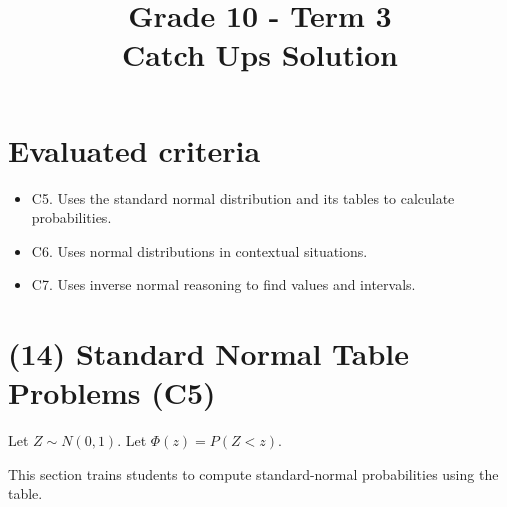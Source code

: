 \makeatletter
{}
\makeatother






\title{Grade 10 - Term 3 \\ Catch Ups Solution}
\author{}
\date{}


	\maketitle
	
	\setcounter{tocdepth}{1}
	\setcounter{secnumdepth}{2}
	\label{toc}
	\tableofcontents
	
	\section*{Evaluated criteria}
	\begin{itemize}
		\item C5. Uses the standard normal distribution and its tables to calculate probabilities.
		\item C6. Uses normal distributions in contextual situations.
		\item C7. Uses inverse normal reasoning to find values and intervals.
	\end{itemize}
	
	\section{(14) Standard Normal Table Problems (C5)}
	\label{sec:standard-normal-table-problems-c5}
	
	Let \(Z\sim N(0,1)\). Let \(\Phi(z)=P(Z<z)\).
	
	This section trains students to compute standard-normal probabilities using the table.
	
